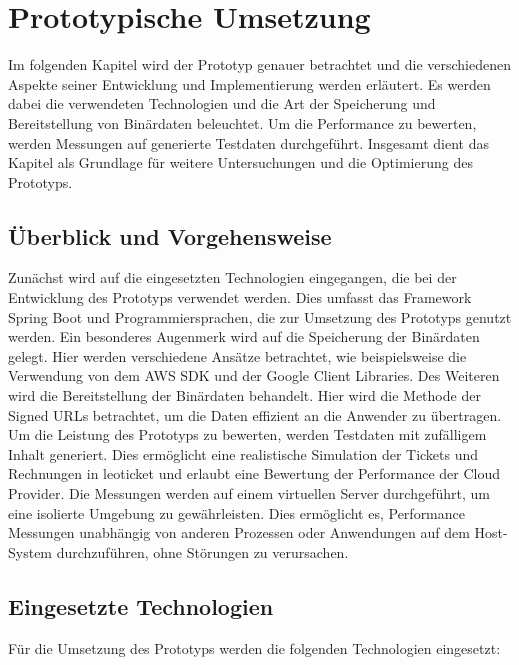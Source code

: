 \chapter{Prototypische Umsetzung}     

Im folgenden Kapitel wird der Prototyp genauer betrachtet und die verschiedenen Aspekte seiner Entwicklung und Implementierung werden erläutert. Es werden dabei die verwendeten Technologien und die Art der Speicherung und Bereitstellung von Binärdaten beleuchtet. Um die Performance zu bewerten, werden Messungen auf generierte Testdaten durchgeführt. Insgesamt dient das Kapitel als Grundlage für weitere Untersuchungen und die Optimierung des Prototyps.\\                               

\section{Überblick und Vorgehensweise}

Zunächst wird auf die eingesetzten Technologien eingegangen, die bei der Entwicklung des Prototyps verwendet werden. Dies umfasst das Framework Spring Boot und Programmiersprachen, die zur Umsetzung des Prototyps genutzt werden. Ein besonderes Augenmerk wird auf die Speicherung der Binärdaten gelegt. Hier werden verschiedene Ansätze betrachtet, wie beispielsweise die Verwendung von dem AWS SDK und der Google Client Libraries. Des Weiteren wird die Bereitstellung der Binärdaten behandelt. Hier wird die Methode der Signed URLs betrachtet, um die Daten effizient an die Anwender zu übertragen. Um die Leistung des Prototyps zu bewerten, werden Testdaten mit zufälligem Inhalt generiert. Dies ermöglicht eine realistische Simulation der Tickets und Rechnungen in leoticket und erlaubt eine Bewertung der Performance der Cloud Provider. Die Messungen werden auf einem virtuellen Server durchgeführt, um eine isolierte Umgebung zu gewährleisten. Dies ermöglicht es, Performance Messungen unabhängig von anderen Prozessen oder Anwendungen auf dem Host-System durchzuführen, ohne Störungen zu verursachen.\\

\newpage

\section{Eingesetzte Technologien}

Für die Umsetzung des Prototyps werden die folgenden Technologien eingesetzt:

